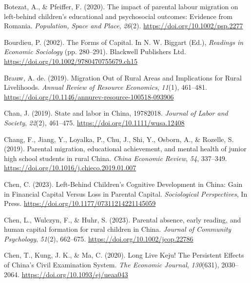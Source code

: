 \documentclass[
  man,floatsintext]{apa7}
\newlength{\cslhangindent}
\newlength{\cslentryspacingunit} %
\newenvironment{CSLReferences}[2] %
 {%
  \setlength{\parindent}{0pt}
  \ifodd #1
  \let\oldpar\par
  \def\par{\hangindent=\cslhangindent\oldpar}
  \fi
  \setlength{\parskip}{#2\cslentryspacingunit}
 }%
 {}
\begin{document}
\begin{CSLReferences}{1}{0}
\leavevmode{}%
Botezat, A., \& Pfeiffer, F. (2020). The impact of parental labour migration on left{-}behind children's educational and psychosocial outcomes: Evidence from Romania. \emph{Population, Space and Place}, \emph{26}(2). \url{https://doi.org/10.1002/psp.2277}

\leavevmode{}%
Bourdieu, P. (2002). The Forms of Capital. In N. W. Biggart (Ed.), \emph{Readings in Economic Sociology} (pp. 280--291). Blackwell Publishers Ltd. \url{https://doi.org/10.1002/9780470755679.ch15}

\leavevmode{}%
Brauw, A. de. (2019). Migration Out of Rural Areas and Implications for Rural Livelihoods. \emph{Annual Review of Resource Economics}, \emph{11}(1), 461--481. \url{https://doi.org/10.1146/annurev-resource-100518-093906}

\leavevmode{}%
Chan, J. (2019). State and labor in {China}, 1978{\textendash}2018. \emph{Journal of Labor and Society}, \emph{22}(2), 461--475. \url{https://doi.org/10.1111/wusa.12408}

\leavevmode{}%
Chang, F., Jiang, Y., Loyalka, P., Chu, J., Shi, Y., Osborn, A., \& Rozelle, S. (2019). Parental migration, educational achievement, and mental health of junior high school students in rural {China}. \emph{{China} Economic Review}, \emph{54}, 337--349. \url{https://doi.org/10.1016/j.chieco.2019.01.007}

\leavevmode{}%
Chen, C. (2023). Left-Behind Children{'}s Cognitive Development in {China}: Gain in Financial Capital Versus Loss in Parental Capital. \emph{Sociological Perspectives}, In Press. \url{https://doi.org/10.1177/07311214221145059}

\leavevmode{}%
Chen, L., Wulczyn, F., \& Huhr, S. (2023). Parental absence, early reading, and human capital formation for rural children in China. \emph{Journal of Community Psychology}, \emph{51}(2), 662--675. \url{https://doi.org/10.1002/jcop.22786}

\leavevmode{}%
Chen, T., Kung, J. K., \& Ma, C. (2020). Long Live Keju! The Persistent Effects of {China}{'}s Civil Examination System. \emph{The Economic Journal}, \emph{130}(631), 2030--2064. \url{https://doi.org/10.1093/ej/ueaa043}


\end{CSLReferences}
\end{document}

